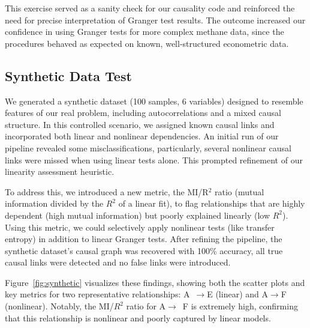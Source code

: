 This exercise served as a sanity check for our causality code and reinforced the need for precise interpretation of Granger test results. The outcome increased our confidence in using Granger tests for more complex methane data, since the procedures behaved as expected on known, well-structured econometric data.

\subsection{Synthetic Data Test}
We generated a synthetic dataset (100 samples, 6 variables) designed to resemble features of our real problem, including autocorrelations and a mixed causal structure. In this controlled scenario, we assigned known causal links and incorporated both linear and nonlinear dependencies. An initial run of our pipeline revealed some misclassifications, particularly, several nonlinear causal links were missed when using linear tests alone. This prompted refinement of our linearity assessment heuristic.

To address this, we introduced a new metric, the MI/R$^2$ ratio (mutual information divided by the $R^2$ of a linear fit), to flag relationships that are highly dependent (high mutual information) but poorly explained linearly (low $R^2$). Using this metric, we could selectively apply nonlinear tests (like transfer entropy) in addition to linear Granger tests. After refining the pipeline, the synthetic dataset’s causal graph was recovered with 100\% accuracy, all true causal links were detected and no false links were introduced.

Figure~\ref{fig:synthetic} visualizes these findings, showing both the scatter plots and key metrics for two representative relationships: A~$\rightarrow$E (linear) and A$\rightarrow$F (nonlinear). Notably, the MI/$R^2$ ratio for A$\rightarrow$~F is extremely high, confirming that this relationship is nonlinear and poorly captured by linear models.

